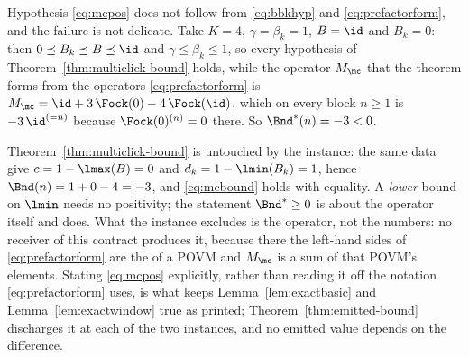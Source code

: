 
\begin{remark}\label{rem:exactpositivity}
Hypothesis \eqref{eq:mcpos} does not follow from \eqref{eq:bbkhyp} and
\eqref{eq:prefactorform}, and the failure is not delicate. Take $K=4$,
$\gamma=\beta_k=1$, $B=\id$ and $B_k=0$: then $0\preceq B_k\preceq B\preceq\id$
and $\gamma\le\beta_k\le1$, so every hypothesis of
Theorem~\ref{thm:multiclick-bound} holds, while the operator $M_{\mc}$ that
the theorem forms from the operators \eqref{eq:prefactorform} is
$M_{\mc}=\id+3\,\Fock(0)-4\,\Fock(\id)$, which on every block $n\ge1$ is
$-3\,\id^{(=n)}$ because $\Fock(0)^{(n)}=0$ there. So $\Bnd^{\ast}(n)=-3<0$.

Theorem~\ref{thm:multiclick-bound} is untouched by the instance: the same data give $c=1-\lmax(B)=0$ and $d_k=1-\lmin(B_k)=1$, hence
$\Bnd(n)=1+0-4=-3$, and \eqref{eq:mcbound} holds with equality. A
\emph{lower} bound on $\lmin$ needs no positivity; the statement
$\Bnd^{\ast}\ge0$ is about the operator itself and does. What the instance
excludes is the operator, not the numbers: no receiver of this contract
produces it, because there the left-hand sides of \eqref{eq:prefactorform}
are the  of a POVM and $M_{\mc}$ is a sum of
that POVM's elements. Stating \eqref{eq:mcpos} explicitly, rather than
reading it off the notation \eqref{eq:prefactorform} uses, is what keeps
Lemma~\ref{lem:exactbasic} and Lemma~\ref{lem:exactwindow} true as printed;
Theorem~\ref{thm:emitted-bound} discharges it at each of the two instances, and no
emitted value depends on the difference.
\end{remark}
